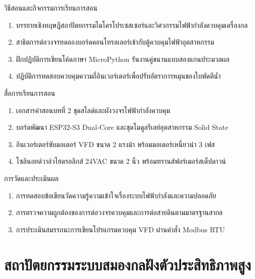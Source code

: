 \begin{planbox}{วิธีสอนและกิจกรรมการเรียนการสอน}
\begin{enumerate}[topsep=2pt, itemsep=1pt, partopsep=0pt, parsep=0pt, leftmargin=1.5em]
    \item บรรยายเชิงทฤษฎีสถาปัตยกรรมไมโครโปรเซสเซอร์และวิศวกรรมไฟฟ้ากำลังควบคุมเครื่องกล
    \item สาธิตการต่อวงจรทดลองบอร์ดคอนโทรลเลอร์เข้ากับตู้ควบคุมไฟฟ้าอุตสาหกรรม
    \item ฝึกปฏิบัติการเขียนโค้ดภาษา MicroPython รันงานคู่ขนานแบบสองแกนประมวลผล
    \item ปฏิบัติการทดสอบควบคุมความถี่อินเวอร์เตอร์เพื่อปรับอัตราการหมุนของใบพัดตีน้ำ
\end{enumerate}
\end{planbox}

\begin{planbox}{สื่อการเรียนการสอน}
\begin{enumerate}[topsep=2pt, itemsep=1pt, partopsep=0pt, parsep=0pt, leftmargin=1.5em]
    \item เอกสารคำสอนบทที่ 2 ชุดสไลด์และผังวงจรไฟฟ้ากำลังควบคุม
    \item บอร์ดพัฒนา ESP32-S3 Dual-Core และชุดโมดูลรีเลย์อุตสาหกรรม Solid State
    \item อินเวอร์เตอร์ขับมอเตอร์ VFD ขนาด 2 แรงม้า พร้อมมอเตอร์เหนี่ยวนำ 3 เฟส
    \item โซลินอยด์วาล์วไฮดรอลิกส์ 24VAC ขนาด 2 นิ้ว พร้อมทรานส์ฟอร์เมอร์สเต็ปดาวน์
\end{enumerate}
\end{planbox}

\begin{planbox}{การวัดและประเมินผล}
\begin{enumerate}[topsep=2pt, itemsep=1pt, partopsep=0pt, parsep=0pt, leftmargin=1.5em]
    \item การทดสอบข้อเขียนวัดความรู้ความเข้าใจเรื่องระบบไฟฟ้ากำลังและความปลอดภัย
    \item การตรวจความถูกต้องของการต่อวงจรควบคุมและการต่อสายดินตามมาตรฐานสากล
    \item การประเมินสมรรถนะการเขียนโปรแกรมควบคุม VFD ผ่านคำสั่ง Modbus RTU
\end{enumerate}
\end{planbox}

\clearpage

\section{สถาปัตยกรรมระบบสมองกลฝังตัวประสิทธิภาพสูง}

